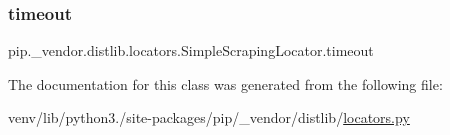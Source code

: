 \subsubsection{\texorpdfstring{timeout}{timeout}}
{\footnotesize\ttfamily pip.\+\_\+vendor.\+distlib.\+locators.\+Simple\+Scraping\+Locator.\+timeout}



The documentation for this class was generated from the following file\+:\begin{DoxyCompactItemize}
\item 
venv/lib/python3./site-\/packages/pip/\+\_\+vendor/distlib/\hyperlink{locators_8py}{locators.\+py}\end{DoxyCompactItemize}
